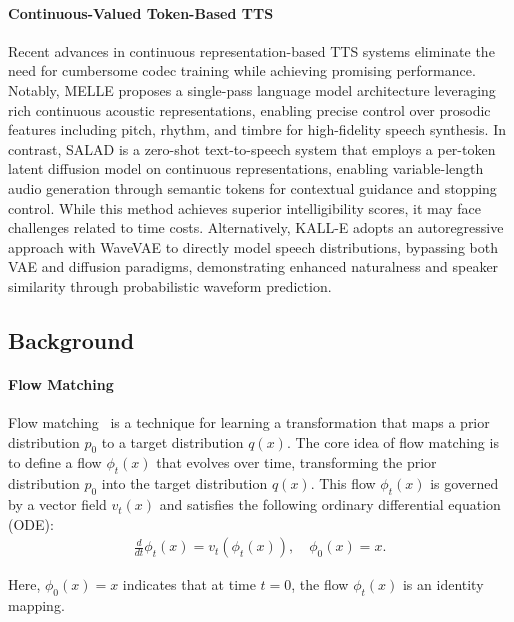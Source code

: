 \paragraph{Continuous-Valued Token-Based TTS}
Recent advances in continuous representation-based TTS systems eliminate the need for cumbersome codec training while achieving promising performance. Notably, MELLE \citep{meng2024autoregressive} proposes a single-pass language model architecture leveraging rich continuous acoustic representations, enabling precise control over prosodic features including pitch, rhythm, and timbre for high-fidelity speech synthesis. In contrast, SALAD \citep{turetzky2024continuous} is a zero-shot text-to-speech system that employs a per-token latent diffusion model on continuous representations, enabling variable-length audio generation through semantic tokens for contextual guidance and stopping control. While this method achieves superior intelligibility scores, it may face challenges related to time costs. Alternatively, KALL-E \citep{zhu2024autoregressive} adopts an autoregressive approach with WaveVAE to directly model speech distributions, bypassing both VAE and diffusion paradigms, demonstrating enhanced naturalness and speaker similarity through probabilistic waveform prediction.

\subsection{Background}
\paragraph{Flow Matching} 
Flow matching~\citep{lipman2022flow} is a technique for learning a transformation that maps a prior distribution \( p_0 \) to a target distribution \( q(x) \). The core idea of flow matching is to define a flow \( \phi_t(x) \) that evolves over time, transforming the prior distribution \( p_0 \) into the target distribution \( q(x) \). This flow \( \phi_t(x) \) is governed by a vector field \( v_t(x) \) and satisfies the following ordinary differential equation (ODE):
\begin{align}
\frac{d}{dt} \phi_t(x) = v_t(\phi_t(x)), \quad \phi_0(x) = x.
\end{align}

Here, \( \phi_0(x) = x \) indicates that at time \( t = 0 \), the flow \( \phi_t(x) \) is an identity mapping.

